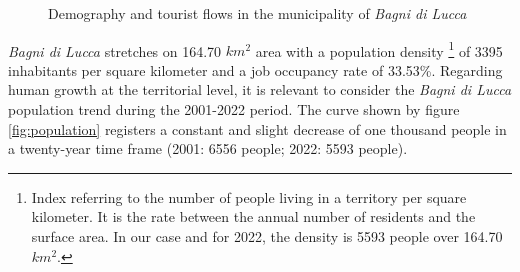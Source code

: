 \documentclass[sustainability,article,submit,pdftex,moreauthors]{Definitions/mdpi}
\begin{document}
\begin{figure}
\hfill
{}
\caption{Demography and tourist flows in the municipality of \emph{Bagni di Lucca}}
\end{figure}


\emph{Bagni di Lucca} stretches on 164.70 $km^2$ area with a population density \footnote{Index referring to the number of people living in a territory per square kilometer. It is the rate between the annual number of residents and the surface area. In our case and for 2022, the density is 5593 people over 164.70 $km^2$.} of 3395 inhabitants per square kilometer and a job occupancy rate of 33.53\%. Regarding human growth at the territorial level, it is relevant to consider the \emph{Bagni di Lucca} population trend during the 2001-2022 period. The curve shown by figure \ref{fig:population} registers a constant and slight decrease of one thousand people in a twenty-year time frame (2001: 6556 people; 2022: 5593 people). 
\end{document}

